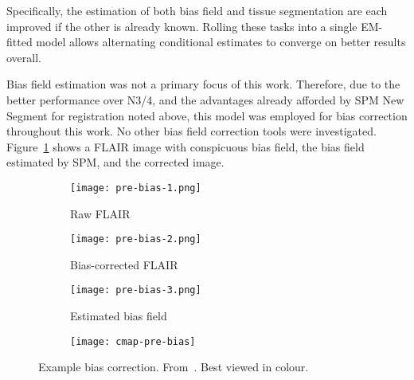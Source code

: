 Specifically, the estimation of both bias field and tissue segmentation are each improved
if the other is already known.
Rolling these tasks into a single EM-fitted model allows
alternating conditional estimates to converge on better results overall.
\par
Bias field estimation was not a primary focus of this work.
Therefore, due to the better performance over N3/4,
and the advantages already afforded by SPM New Segment for registration noted above,
this model was employed for bias correction throughout this work.
No other bias field correction tools were investigated.
Figure~\ref{fig:pre-bias} shows a FLAIR image with conspicuous bias field,
the bias field estimated by SPM, and the corrected image.
\par
\begin{figure}
  \centering
  \begin{subfigure}{0.3\textwidth}
    \centering
    \texttt{[image: pre-bias-1.png]}
    \caption{Raw FLAIR}
  \end{subfigure}
  \begin{subfigure}{0.3\textwidth}
    \centering
    \texttt{[image: pre-bias-2.png]}
    \caption{Bias-corrected FLAIR}
  \end{subfigure}
  \begin{subfigure}{0.30\textwidth}
    \centering
    \texttt{[image: pre-bias-3.png]}
    \caption{Estimated bias field}
  \end{subfigure}
  \begin{subfigure}{0.04\textwidth}
    \texttt{[image: cmap-pre-bias]}
    \\\vphantom{(x)}
  \end{subfigure}
  \caption{Example bias correction. From~\cite{WMHSEG2017}. Best viewed in colour.}%
  \label{fig:pre-bias}
\end{figure}
